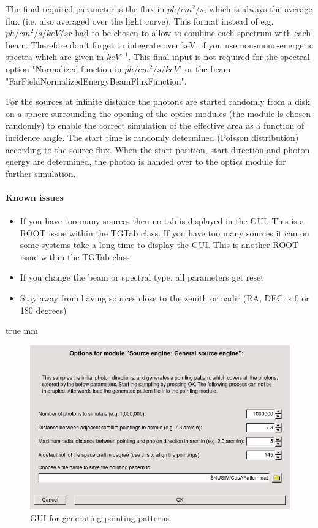 The final required parameter is the flux in $ph/cm^2/s$, which is always the average flux (i.e. also averaged over the light curve).
This format instead of e.g. $ph/cm^2/s/keV/sr$ had to be chosen to allow to combine each spectrum with each beam. 
Therefore don't forget to integrate over keV, if you use non-mono-energetic spectra which are given in $keV^{-1}$. 
This final input is not required for the spectral option "Normalized function in $ph/cm^2/s/keV$" or the beam "FarFieldNormalizedEnergyBeamFluxFunction".


For the sources at infinite distance the photons are started randomly from a disk on a sphere surrounding the opening of the optics modules (the module is chosen randomly) to enable the correct simulation of the effective area as a function of incidence angle. The start time is randomly determined (Poisson distribution) according to the source flux. When the start position, start direction and photon energy are determined, the photon is handed over to the optics module for further simulation.


\paragraph{Known issues} 

\begin{itemize}
\item If you have too many sources then no tab is displayed in the GUI. This is a ROOT issue within the TGTab class. If you have too many sources it can on some systems take a long time to display the GUI. This is another ROOT issue within the TGTab class.
\item If you change the beam or spectral type, all parameters get reset
\item Stay away from having sources close to the zenith or nadir (RA, DEC is 0 or 180 degrees) 
\end{itemize}

 true mm

\begin{figure}[tb]
\begin{center}
\includegraphics[scale=0.5]{images/pointingpatternGUI.png}  
\caption{GUI for generating pointing patterns.}
\label{pointingpatterngui} 
\end{center}
\end{figure}

